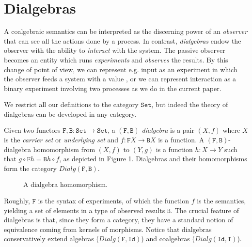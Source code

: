 \documentclass[orivec]{llncs}
\newcommand{\obj}[3]{\node (#1) [#2] {$#3$};}
\newcommand{\arr}[3]{\path[->,font=\scriptsize](#2) edge node[auto] {$#1$} (#3);}
\newcommand{\mC}[1]{\mathtt{#1}}
\newcommand{\mF}[1]{\mathtt{#1}}
\newcommand{\Set}{\mC{Set}}
\newcommand{\Id}{\mF{Id}}
\newcommand{\F}{\mF{F}}
\newcommand{\B}{\mF{B}}
\newcommand{\T}{\mF{T}}
\newcommand{\dialg}{\mathit{Dialg}}
\newcommand{\defend}{}
\renewenvironment{definition}{\begin{defn}}{\defend\end{defn}}
\begin{document}
\section{Dialgebras}
\label{sec:dialgebras}

A coalgebraic semantics can be interpreted as the discerning power of an \emph{observer} that can see all the actions done by a process. In contrast,  \emph{dialgebras} endow the observer with the ability to \emph{interact} with the system. The passive observer becomes an entity which runs \emph{experiments} and \emph{observes} the results. By this change of point of view, we can represent e.g. input as an experiment in which the observer feeds a system with a value \cite{Cia11}, or we can represent interaction as a binary experiment involving two processes as we do in the current paper.

We restrict all our definitions to the category $\Set$, but indeed the theory of dialgebras can be developed in any category.

\begin{definition}\label{def:dialgebra} Given two functors $\F, \B : \Set \to \Set$, a $(\F,\B)$-\emph{dialgebra} is a pair $(X,f)$ where $X$ is the \emph{carrier set} or \emph{underlying set} and $f : \F X \to \B X$ is a function. A $(\F,\B)$-dialgebra homomorphism from $(X,f)$ to $(Y,g)$ is a function $h : X \to Y$ such that $g \circ \F h = \B h \circ f$, as depicted in Figure \ref{fig:dialgebra-homomorphism}. Dialgebras and their homomorphisms form the category $\dialg(\F,\B)$.
\end{definition}

\begin{figure}
	\begin{center}
	\end{center}
	\caption{A dialgebra homomorphism.} \label{fig:dialgebra-homomorphism}
\end{figure}



Roughly, $\F$ is the syntax of experiments, of which the function $f$ is the semantics, yielding a set of elements in a type of observed results $\B$. The crucial feature of dialgebras is that, since they form a category, they have a standard notion of equivalence coming from kernels of morphisms. Notice that dialgebras conservatively extend algebras ($\dialg(\F,\Id)$) and coalgebras ($\dialg(\Id,\T)$).
\end{document}
